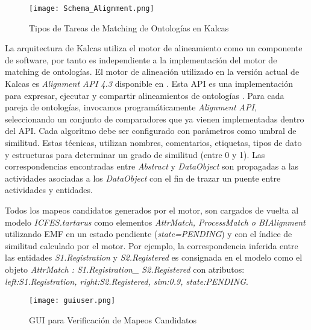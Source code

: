 \begin{figure} [!t]
\begin{center}
	\texttt{[image: Schema\_Alignment.png]}
	\caption{Tipos de Tareas de Matching de Ontolog\'ias en Kalcas}
	\label{fig:alignmenttask}
\end{center}	
\end{figure}


La arquitectura de Kalcas utiliza el motor de alineamiento como un componente de software, por tanto es independiente a la implementaci\'on del motor de matching de ontolog\'ias. El motor de alineaci\'on utilizado en la versi\'on actual de Kalcas es \textit{Alignment API 4.3} disponible en \cite{AlignmentAPI:2012}. Esta API es una implementaci\'on para expresar, ejecutar y compartir alineamientos de ontolog\'ias \cite{David:2011}. Para cada pareja de ontolog\'ias, invocamos program\'aticamente \textit{Alignment API}, seleccionando un conjunto de comparadores que ya vienen implementadas dentro del API. Cada algoritmo debe ser configurado con par\'ametros como umbral de similitud. Estas t\'ecnicas, utilizan nombres, comentarios, etiquetas, tipos de dato y estructuras para determinar un grado de similitud (entre 0 y 1). Las correspondencias encontradas entre \textit{Abstract} y \textit{DataObject} son propagadas a las actividades asociadas a los \textit{DataObject} con el fin de trazar un puente entre actividades y entidades.

Todos los mapeos candidatos generados por el motor, son cargados de vuelta al modelo \textit{ICFES.tartarus} como elementos \textit{AttrMatch, ProcessMatch o BIAlignment} utilizando EMF en un estado pendiente (\textit{state=PENDING}) y con el \'indice de similitud calculado por el motor. Por ejemplo, la correspondencia inferida entre las entidades \textit{S1.Registration} y \textit{S2.Registered} es consignada en el modelo como el objeto \textit{AttrMatch : S1.Registration\_ S2.Registered} con atributos: \textit{left:S1.Registration, right:S2.Registered, sim:0.9, state:PENDING}. 

\begin{figure} [!t]
\begin{center}
	\texttt{[image: guiuser.png]}
	\caption{GUI para Verificaci\'on de Mapeos Candidatos}
	\label{fig:Confirmation}
\end{center}	
\end{figure}

